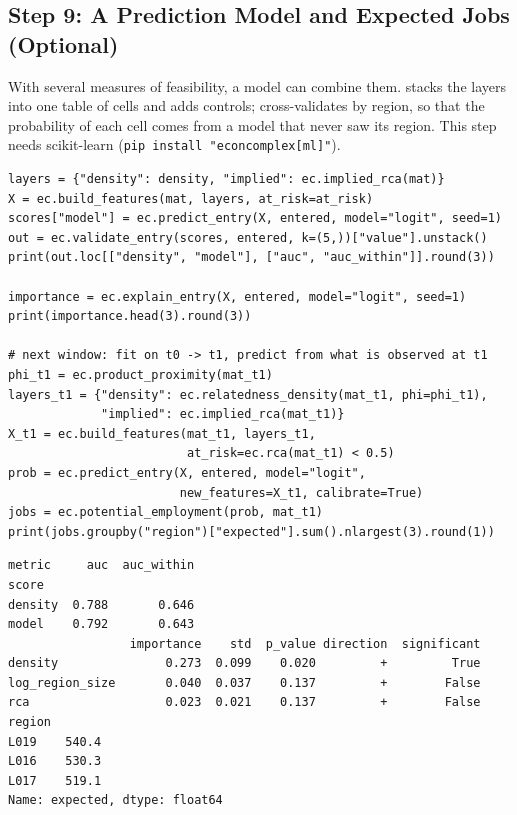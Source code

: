 \subsection{Step 9: A Prediction Model and Expected Jobs (Optional)}

With several measures of feasibility, a model can combine them.
 stacks the layers into one table of cells and adds
controls;  cross-validates by region, so that the
probability of each cell comes from a model that never saw its region.
This step needs scikit-learn
(\texttt{pip install "econcomplex[ml]"}).

\begin{lstlisting}
layers = {"density": density, "implied": ec.implied_rca(mat)}
X = ec.build_features(mat, layers, at_risk=at_risk)
scores["model"] = ec.predict_entry(X, entered, model="logit", seed=1)
out = ec.validate_entry(scores, entered, k=(5,))["value"].unstack()
print(out.loc[["density", "model"], ["auc", "auc_within"]].round(3))

importance = ec.explain_entry(X, entered, model="logit", seed=1)
print(importance.head(3).round(3))

# next window: fit on t0 -> t1, predict from what is observed at t1
phi_t1 = ec.product_proximity(mat_t1)
layers_t1 = {"density": ec.relatedness_density(mat_t1, phi=phi_t1),
             "implied": ec.implied_rca(mat_t1)}
X_t1 = ec.build_features(mat_t1, layers_t1,
                         at_risk=ec.rca(mat_t1) < 0.5)
prob = ec.predict_entry(X, entered, model="logit",
                        new_features=X_t1, calibrate=True)
jobs = ec.potential_employment(prob, mat_t1)
print(jobs.groupby("region")["expected"].sum().nlargest(3).round(1))
\end{lstlisting}
\begin{lstlisting}[language={}, numbers=none, backgroundcolor=\color{white}, frame=leftline, framerule=2pt, rulecolor=\color{noteborder}, xleftmargin=1.5em]
metric     auc  auc_within
score                     
density  0.788       0.646
model    0.792       0.643
                 importance    std  p_value direction  significant
density               0.273  0.099    0.020         +         True
log_region_size       0.040  0.037    0.137         +        False
rca                   0.023  0.021    0.137         +        False
region
L019    540.4
L016    530.3
L017    519.1
Name: expected, dtype: float64
\end{lstlisting}


